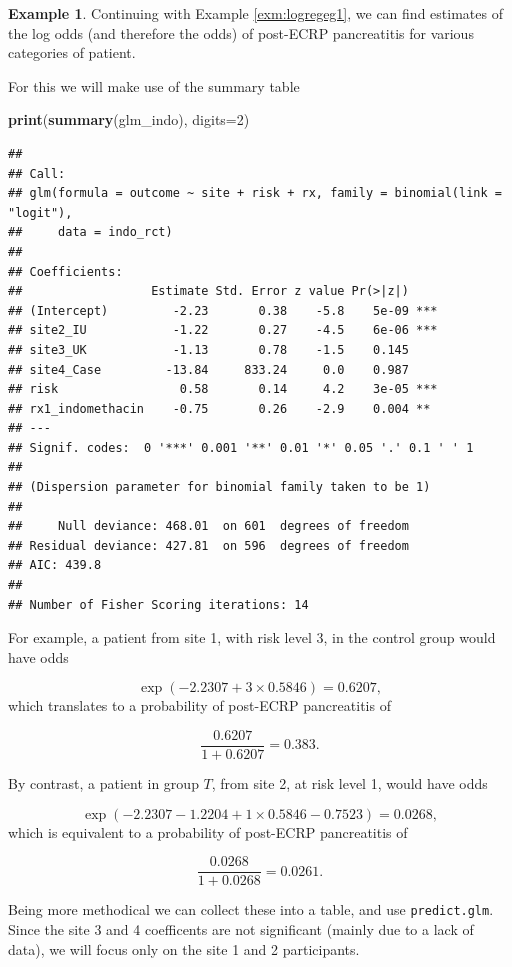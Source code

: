 \documentclass[
  openany]{book}
\newenvironment{Shaded}{\begin{snugshade}}{\end{snugshade}}
\newcommand{\AttributeTok}[1]{\textcolor[rgb]{0.13,0.29,0.53}{#1}}
\newcommand{\DecValTok}[1]{\textcolor[rgb]{0.00,0.00,0.81}{#1}}
\newcommand{\FunctionTok}[1]{\textcolor[rgb]{0.13,0.29,0.53}{\textbf{#1}}}
\newcommand{\NormalTok}[1]{#1}
\theoremstyle{definition}
\theoremstyle{definition}
\newtheorem{example}{Example}[chapter]
\theoremstyle{definition}
\theoremstyle{definition}
\theoremstyle{remark}
\begin{document}
\begin{example}

Continuing with Example \ref{exm:logregeg1}, we can find estimates of the log odds (and therefore the odds) of post-ECRP pancreatitis for various categories of patient.

For this we will make use of the summary table

\begin{Shaded}
\begin{Highlighting}[]
\FunctionTok{print}\NormalTok{(}\FunctionTok{summary}\NormalTok{(glm\_indo), }\AttributeTok{digits=}\DecValTok{2}\NormalTok{)}
\end{Highlighting}
\end{Shaded}

\begin{verbatim}
## 
## Call:
## glm(formula = outcome ~ site + risk + rx, family = binomial(link = "logit"), 
##     data = indo_rct)
## 
## Coefficients:
##                  Estimate Std. Error z value Pr(>|z|)    
## (Intercept)         -2.23       0.38    -5.8    5e-09 ***
## site2_IU            -1.22       0.27    -4.5    6e-06 ***
## site3_UK            -1.13       0.78    -1.5    0.145    
## site4_Case         -13.84     833.24     0.0    0.987    
## risk                 0.58       0.14     4.2    3e-05 ***
## rx1_indomethacin    -0.75       0.26    -2.9    0.004 ** 
## ---
## Signif. codes:  0 '***' 0.001 '**' 0.01 '*' 0.05 '.' 0.1 ' ' 1
## 
## (Dispersion parameter for binomial family taken to be 1)
## 
##     Null deviance: 468.01  on 601  degrees of freedom
## Residual deviance: 427.81  on 596  degrees of freedom
## AIC: 439.8
## 
## Number of Fisher Scoring iterations: 14
\end{verbatim}

For example, a patient from site 1, with risk level 3, in the control group would have odds

\[\exp\left(-2.2307 + 3\times 0.5846\right) = 0.6207, \]
which translates to a probability of post-ECRP pancreatitis of

\[\frac{0.6207}{1+0.6207} = 0.383. \]

By contrast, a patient in group \(T\), from site 2, at risk level 1, would have odds

\[\exp\left(-2.2307 - 1.2204 + 1\times 0.5846 - 0.7523\right) = 0.0268, \]
which is equivalent to a probability of post-ECRP pancreatitis of

\[\frac{0.0268}{1+0.0268} = 0.0261.\]

Being more methodical we can collect these into a table, and use \texttt{predict.glm}. Since the site 3 and 4 coefficents are not significant (mainly due to a lack of data), we will focus only on the site 1 and 2 participants.


\end{example}
\end{document}
